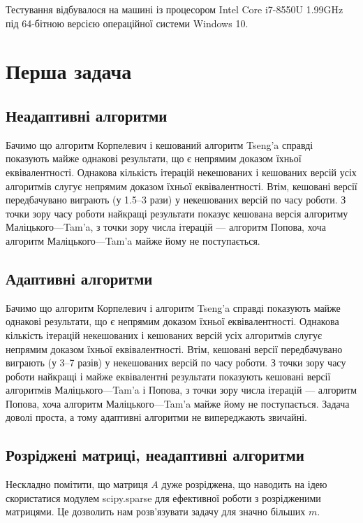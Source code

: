Тестування відбувалося на машині із процесором Intel Core i7-8550U 1.99GHz під 64-бітною версією операційної системи Windows 10.

\section{Перша задача}

\subsection{Неадаптивні алгоритми}



Бачимо що алгоритм Корпелевич і кешований алгоритм Tseng'a справді показують майже однакові результати, що є непрямим доказом їхньої еквівалентності. Однакова кількість ітерацій некешованих і кешованих версій усіх алгоритмів слугує непрямим доказом їхньої еквівалентності. Втім, кешовані версії передбачувано виграють (у 1.5--3 рази) у некешованих версій по часу роботи. З точки зору часу роботи найкращі результати показує кешована версія алгоритму Маліцького---Tam'a, з точки зору числа ітерацій --- алгоритм Попова, хоча алгоритм Маліцького---Tam'a майже йому не поступається.

\newpage\subsection{Адаптивні алгоритми}



Бачимо що алгоритм Корпелевич і алгоритм Tseng'a справді показують майже однакові результати, що є непрямим доказом їхньої еквівалентності. Однакова кількість ітерацій некешованих і кешованих версій усіх алгоритмів слугує непрямим доказом їхньої еквівалентності. Втім, кешовані версії передбачувано виграють (у 3--7 разів) у некешованих версій по часу роботи. З точки зору часу роботи найкращі і майже еквівалентні результати показують кешовані версії алгоритмів Маліцького---Tam'a і Попова, з точки зору числа ітерацій --- алгоритм Попова, хоча алгоритм Маліцького---Tam'a майже йому не поступається. Задача доволі проста, а тому адаптивні алгоритми не випереджають звичайні.

\newpage\subsection{Розріджені матриці, неадаптивні алгоритми}

Нескладно помітити, що матриця $A$ дуже розріджена, що наводить на ідею скористатися модулем scipy.sparse для ефективної роботи з розрідженими матрицями. Це дозволить нам розв'язувати задачу для значно більших $m$.

